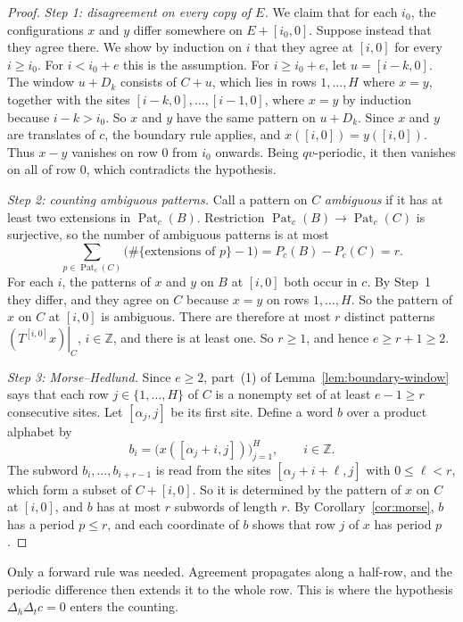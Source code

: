 \documentclass[11pt,a4paper,reqno]{amsart}
\theoremstyle{definition}
\theoremstyle{remark}
\newcommand{\Z}{\mathbb Z}
\newcommand{\De}{\Delta}
\newcommand{\restr}[2]{\left.#1\right|_{#2}}
\newcommand{\rc}[2]{[#1,#2]}
\DeclareMathOperator{\Pat}{Pat}
\numberwithin{equation}{section}
\begin{document}
\begin{proof}
\emph{Step 1: disagreement on every copy of $E$.} We claim that for each $i_0$, the configurations $x$ and $y$ differ somewhere on $E+\rc{i_0}0$. Suppose instead that they agree there. We show by induction on $i$ that they agree at $\rc i0$ for every $i\ge i_0$. For $i<i_0+e$ this is the assumption. For $i\ge i_0+e$, let $u=\rc{i-k}0$. The window $u+D_k$ consists of $C+u$, which lies in rows $1,\ldots,H$ where $x=y$, together with the sites $\rc{i-k}0,\ldots,\rc{i-1}0$, where $x=y$ by induction because $i-k>i_0$. So $x$ and $y$ have the same pattern on $u+D_k$. Since $x$ and $y$ are translates of $c$, the boundary rule applies, and $x(\rc i0)=y(\rc i0)$. Thus $x-y$ vanishes on row $0$ from $i_0$ onwards. Being $qv$-periodic, it then vanishes on all of row $0$, which contradicts the hypothesis.

\emph{Step 2: counting ambiguous patterns.} Call a pattern on $C$ \emph{ambiguous} if it has at least two extensions in $\Pat_c(B)$. Restriction $\Pat_c(B)\to\Pat_c(C)$ is surjective, so the number of ambiguous patterns is at most
\[
 \sum_{p\in\Pat_c(C)}\bigl(\#\{\text{extensions of }p\}-1\bigr)=P_c(B)-P_c(C)=r.
\]
For each $i$, the patterns of $x$ and $y$ on $B$ at $\rc i0$ both occur in $c$. By Step~1 they differ, and they agree on $C$ because $x=y$ on rows $1,\ldots,H$. So the pattern of $x$ on $C$ at $\rc i0$ is ambiguous. There are therefore at most $r$ distinct patterns $\restr{(T^{\rc i0}x)}{C}$, $i\in\Z$, and there is at least one. So $r\ge1$, and hence $e\ge r+1\ge2$.

\emph{Step 3: Morse--Hedlund.} Since $e\ge2$, part~(1) of Lemma~\ref{lem:boundary-window} says that each row $j\in\{1,\ldots,H\}$ of $C$ is a nonempty set of at least $e-1\ge r$ consecutive sites. Let $\rc{\alpha_j}j$ be its first site. Define a word $b$ over a product alphabet by
\[
 b_i=\bigl(x(\rc{\alpha_j+i}j)\bigr)_{j=1}^{H},\qquad i\in\Z.
\]
The subword $b_i,\ldots,b_{i+r-1}$ is read from the sites $\rc{\alpha_j+i+\ell}j$ with $0\le\ell<r$, which form a subset of $C+\rc i0$. So it is determined by the pattern of $x$ on $C$ at $\rc i0$, and $b$ has at most $r$ subwords of length $r$. By Corollary~\ref{cor:morse}, $b$ has a period $p\le r$, and each coordinate of $b$ shows that row $j$ of $x$ has period $p$.
\end{proof}

Only a forward rule was needed. Agreement propagates along a half-row, and the periodic difference then extends it to the whole row. This is where the hypothesis $\De_h\De_tc=0$ enters the counting.
\end{document}

